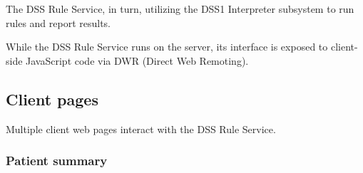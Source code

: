 \documentclass[12pt,letterpaper]{article}
\begin{document}
The DSS Rule Service, in turn, utilizing the DSS1 Interpreter subsystem to run rules and report results.

While the DSS Rule Service runs on the server, its interface is exposed to client-side JavaScript code via DWR (Direct Web Remoting).

\subsection{Client pages}

Multiple client web pages interact with the DSS Rule Service.

\subsubsection{Patient summary}
\end{document}
